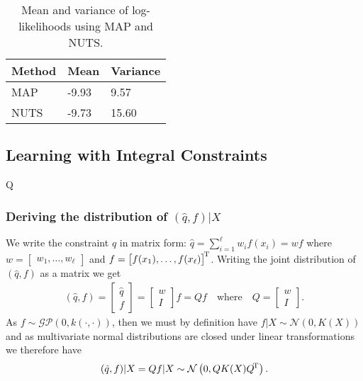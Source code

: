 \begin{table}[H]
  \centering
  \begin{tabular}{lll}
    \toprule
    Method & Mean  & Variance \\
    \midrule
    MAP    & -9.93 & 9.57     \\
    NUTS   & -9.73 & 15.60    \\
    \bottomrule
  \end{tabular}  
  \caption{
    Mean and variance of log-likelihoods using MAP and NUTS.
  }
  \label{tab:gp:map_nuts_ll_mean_var}
\end{table}

\subsection{Learning with Integral Constraints}Q

\subsubsection{Deriving the distribution of $(\hat{q}, f) | X$}

We write the constraint $\hat{q}$ in matrix form:
$
  \hat{q} = \sum_{i=1}^\ell w_i f(x_i) = {w} f
$
where $w = \begin{bmatrix} w_1, \ldots, w_\ell \end{bmatrix}$
and $f = {\begin{bmatrix} f(x_1), \ldots, f(x_\ell) \end{bmatrix}}^{\!\text{T}}$.
%
Writing the joint distribution of $(\hat{q}, f)$ as a matrix we get
\begin{align*}
  (\hat{q}, f)
  = \left[ \begin{array}{c} \hat{q} \\ \hline f \end{array} \right]
  = \left[ \begin{array}{c} w \\ \hline I \end{array} \right] f
  = Q f
  \quad \text{where} \quad
  Q = \left[ \begin{array}{c} w \\ \hline I \end{array} \right].
\end{align*}
%
As $f \sim \mathcal{GP}(0, k(\cdot, \cdot))$, then we must by definition have
$f | X \sim \mathcal{N}\left( 0, K(X) \right)$
and as multivariate normal distributions are closed under linear transformations
we therefore have
\begin{align*}
  (\hat{q}, f) | X
  = Q f | X
  \sim \mathcal{N}\left( 0, Q K(X) {Q}^{\!\text{T}} \right).
\end{align*}

